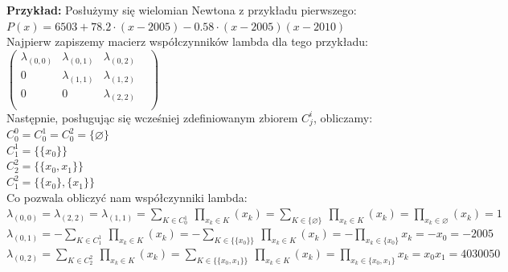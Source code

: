 \documentclass[a4paper,12pt]{article}
\newcommand{\id}{\noindent}
\newcommand{\el}[2]{\lambda_{(#1, #2)}}
\newcommand{\bl}[1]{\textbf{#1}}
\begin{document}
\id
\bl{Przykład:} Posłużymy się wielomian Newtona z przykładu pierwszego: \\

$P(x)=6503+78.2\cdot(x-2005)-0.58\cdot(x-2005)(x-2010)$ \\

\id
Najpierw zapiszemy macierz współczynników lambda dla tego przykładu: \\

$
\begin{pmatrix}
\el{0}{0} & \el{0}{1} & \el{0}{2} \\
0 & \el{1}{1} & \el{1}{2} \\
0 & 0 & \el{2}{2} &\\
\end{pmatrix}
$ \\

\id
Następnie, posługując się wcześniej zdefiniowanym zbiorem $C_j^i$, obliczamy: \\

$C^0_0 = C^1_0 = C^2_0 = \{ \varnothing \}$ \\

$C^1_1 = \{ \{x_0\} \}$ \\

$C^2_2 = \{ \{x_0, x_1 \} \}$ \\

$C^2_1 = \{ \{x_0\}, \{ x_1 \} \}$ \\

\id
Co pozwala obliczyć nam współczynniki lambda: \\

$\el{0}{0} = \el{2}{2} = \el{1}{1} = \sum\limits_{K \in C^1_{0}} \ \prod\limits_{x_k \in K} \left( x_k \right) = \sum\limits_{K \in \{ \varnothing \}} \ \prod\limits_{x_k \in K} \left( x_k \right) = \prod\limits_{x_k \in \varnothing} \left( x_k \right) = 1$ \\


$\el{0}{1} = -\sum\limits_{K \in C^1_{1}} \ \prod\limits_{x_k \in K} \left( x_k \right) =  -\sum\limits_{K \in \{ \{x_0\} \}} \ \prod\limits_{x_k \in K} \left( x_k \right) = -\prod\limits_{x_k \in \{x_0\}}x_k = -x_0 = -2005$ \\


$\el{0}{2} = \sum\limits_{K \in C^2_{2}} \ \prod\limits_{x_k \in K} \left( x_k \right) =  \sum\limits_{K \in \{ \{x_0, x_1\} \}} \ \prod\limits_{x_k \in K} \left( x_k \right) = \prod\limits_{x_k \in \{x_0, x_1\}}x_k = x_0x_1 = 4030050$ \\
\end{document}
